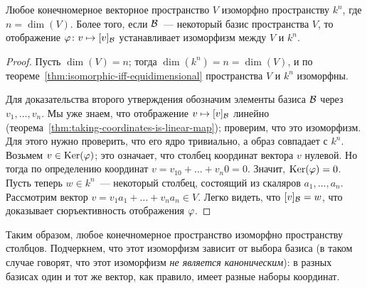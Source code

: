 \begin{corollary}
Любое конечномерное векторное пространство $V$ изоморфно пространству
$k^n$, где $n=\dim(V)$.
Более того, если $\mathcal B$~--- некоторый базис пространства $V$,
то отображение $\varphi\colon v\mapsto [v]_{\mathcal B}$ устанавливает изоморфизм между
$V$ и $k^n$.
\end{corollary}
\begin{proof}
Пусть $\dim(V)=n$; тогда $\dim(k^n)=n=\dim(V)$, и
по теореме~\ref{thm:isomorphic-iff-equidimensional} пространства $V$ и $k^n$
изоморфны.

Для доказательства второго утверждения обозначим элементы базиса $\mathcal B$
через $v_1,\dots,v_n$.
Мы уже знаем, что отображение $v\mapsto [v]_{\mathcal B}$ линейно
(теорема~\ref{thm:taking-coordinates-is-linear-map}); проверим, что это
изоморфизм. Для этого нужно проверить, что его ядро тривиально, а образ
совпадает с $k^n$. Возьмем $v\in\operatorname{Ker}(\varphi)$; это означает, что столбец
координат вектора $v$ нулевой. Но тогда по определению координат
$v=v_10+\dots+v_n0 = 0$. Значит, $\operatorname{Ker}(\varphi)=0$. Пусть теперь
$w\in k^n$~--- некоторый столбец, состоящий из скаляров
$a_1,\dots,a_n$. Рассмотрим вектор $v = v_1a_1 + \dots + v_na_n\in V$.
Легко видеть, что $[v]_{\mathcal B} = w$, что доказывает сюръективность
отображения $\varphi$.
\end{proof}

Таким образом, любое конечномерное пространство изоморфно пространству столбцов.
Подчеркнем, что этот изоморфизм зависит от выбора базиса (в таком случае говорят,
что этот изоморфизм {\em не является каноническим}): в разных базисах один
и тот же вектор, как правило, имеет разные наборы координат.

